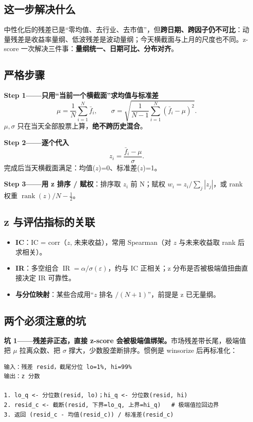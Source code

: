 \documentclass[UTF8,11pt]{ctexart}
\begin{document}
\subsection{这一步解决什么}
中性化后的残差已是“零均值、去行业、去市值”，但\textbf{跨日期、跨因子仍不可比}：动量残差是收益率量纲、低波残差是波动量纲；今天横截面与上月的尺度也不同。z-score 一次解决三件事：\textbf{量纲统一、日期可比、分布对齐}。

\subsection{严格步骤}
\textbf{Step 1——只用“当前一个横截面”求均值与标准差}
\begin{equation}
\mu=\frac1N\sum_{i=1}^{N}\bar f_i,\qquad
\sigma=\sqrt{\frac{1}{N-1}\sum_{i=1}^{N}(\bar f_i-\mu)^2}.
\end{equation}
$\mu,\sigma$ 只在当天全部股票上算，\textbf{绝不跨历史混合}。

\textbf{Step 2——逐个代入}
\begin{equation}
z_i = \frac{\bar f_i-\mu}{\sigma}.
\end{equation}
完成后当天横截面满足：均值($z$)=0、标准差($z$)=1。

\textbf{Step 3——用 z 排序 / 赋权}：排序取 $z_i$ 前 N；赋权 $w_i=z_i/\sum_j|z_j|$，或 rank 权重 $\operatorname{rank}(z)/N-\tfrac12$。

\subsection{z 与评估指标的关联}
\begin{itemize}[itemsep=2pt]
\item \textbf{IC}：IC = corr（$z$, 未来收益），常用 Spearman（对 $z$ 与未来收益取 rank 后求相关）。
\item \textbf{IR}：多空组合 $\operatorname{IR}=\alpha/\sigma(\varepsilon)$，约与 IC 正相关；z 分布是否被极端值扭曲直接决定 IR 可靠性。
\item \textbf{与分位映射}：某些合成用“$z$ 排名 $/(N+1)$”，前提是 z 已无量纲。
\end{itemize}

\subsection{两个必须注意的坑}
\textbf{坑 1——残差非正态，直接 z-score 会被极端值绑架。}市场残差带长尾，极端值把 $\mu$ 拉离众数、把 $\sigma$ 撑大，少数股垄断排序。惯例是 winsorize 后再标准化：
\begin{lstlisting}[language={},caption={截尾 z-score（伪代码）}]
输入：残差 resid，截尾分位 lo=1%, hi=99%
输出：z 分数

1. lo_q <- 分位数(resid, lo)；hi_q <- 分位数(resid, hi)
2. resid_c <- 截断(resid, 下界=lo_q, 上界=hi_q)   # 极端值拉回边界
3. 返回 (resid_c - 均值(resid_c)) / 标准差(resid_c)
\end{lstlisting}
\end{document}
